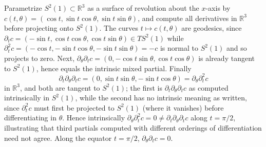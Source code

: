 \begin{example}
  \label{ex:pet-ch6-sphere-third-partials}


  Parametrize $S^2(1)\subset\mathbb{R}^3$ as a surface of revolution about the
  $x$-axis by $c(t,\theta)=(\cos t,\sin t\cos\theta,\sin t\sin\theta)$, and
  compute all derivatives in $\mathbb{R}^3$ before projecting onto $S^2(1)$. The
  curves $t\mapsto c(t,\theta)$ are geodesics, since
  $\partial_tc=(-\sin t,\cos t\cos\theta,\cos t\sin\theta)\in TS^2(1)$ while
  $\partial_t^2c=(-\cos t,-\sin t\cos\theta,-\sin t\sin\theta)=-c$ is normal to
  $S^2(1)$ and so projects to zero. Next,
  $\partial_\theta\partial_tc=(0,-\cos t\sin\theta,\cos t\cos\theta)$ is already
  tangent to $S^2(1)$, hence equals the intrinsic mixed partial. Finally
  \[
    \partial_t\partial_\theta\partial_tc=(0,\sin t\sin\theta,-\sin t\cos\theta)
    =\partial_\theta\partial_t^2c
  \]
  in $\mathbb{R}^3$, and both are tangent to $S^2(1)$; the first is
  $\partial_t\partial_\theta\partial_tc$ as computed intrinsically in $S^2(1)$,
  while the second has no intrinsic meaning as written, since $\partial_t^2c$
  must first be projected to $S^2(1)$ (where it vanishes) before differentiating
  in $\theta$. Hence intrinsically
  $\partial_\theta\partial_t^2c=0\ne\partial_t\partial_\theta\partial_tc$ along
  $t=\pi/2$, illustrating that third partials computed with different orderings of
  differentiation need not agree. Along the equator $t=\pi/2$,
  $\partial_\theta\partial_tc=0$.
\end{example}

